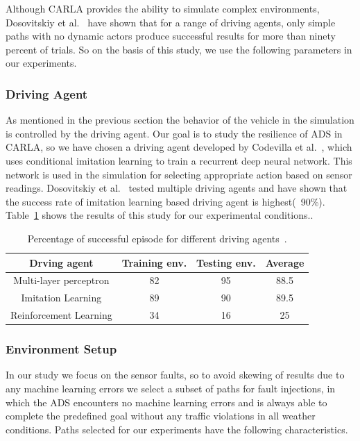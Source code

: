 Although CARLA provides the ability to simulate complex environments, Dosovitskiy et al.~\cite{Dosovitskiy17} have shown that for a range of driving agents, only simple paths with no dynamic actors produce successful results for more than ninety percent of trials. So on the basis of this study, we use the following parameters in our experiments.
 
 \subsubsection{Driving Agent}
 As mentioned in the previous section the behavior of the vehicle in the simulation is controlled by the driving agent. Our goal is to study the resilience of ADS in CARLA, so we have chosen a driving agent developed by Codevilla et al.~\cite{Codevilla2018}, which uses conditional imitation learning to train a recurrent deep neural network. This network is used in the simulation for selecting appropriate action based on sensor readings. Dosovitskiy et al.~\cite{Dosovitskiy17} tested multiple driving agents and have shown that the success rate of imitation learning based driving agent is highest(~90\%). Table~\ref{table:1} shows the results of this study for our experimental conditions..
 
\begin{table}
	\vspace{1.0em}
	\begin{tabular}{| c | c | c | c |}
		\hline
		Drving agent & Training env. & Testing env. & Average  \\
		\hline
		Multi-layer perceptron & 82 & 95 & 88.5  \\ 
 		Imitation Learning & 89 & 90 & 89.5 \\  
 		Reinforcement Learning  & 34 & 16 & 25 \\
 		\hline
 	\end{tabular}
 \caption{Percentage of successful episode for different driving agents~\cite{Dosovitskiy17}.}
 \label{table:1}
 \vspace{-2.0em}
\end{table}

  \smallskip
  
 \subsubsection{Environment Setup}
 \setcounter{subsubsection}{0}
In our study we focus on the sensor faults, so to avoid skewing of results due to any machine learning errors we select a subset of paths for fault injections, in which the ADS encounters no machine learning errors and is always able to complete the predefined goal without any traffic violations in all weather conditions. Paths selected for our experiments have the following characteristics.

